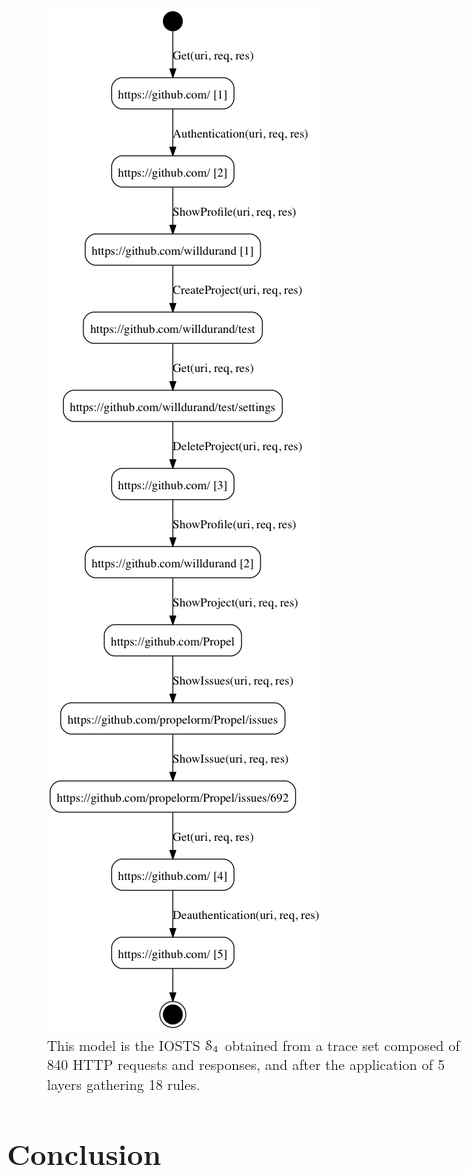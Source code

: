 \begin{figure}[ht]
    \includegraphics[width=.45\textwidth]{figures/gh-2-4-bis.png}

    \caption {This model is the IOSTS $\EuScript{S}_4$ obtained
    from a trace set composed of 840 HTTP requests and responses,
    and after the application of 5 layers gathering 18 rules.}
    \label{fig:git:iosts}
\end{figure}


\section{Conclusion}
\label{sec:modelinf:webapps:conclusion}

